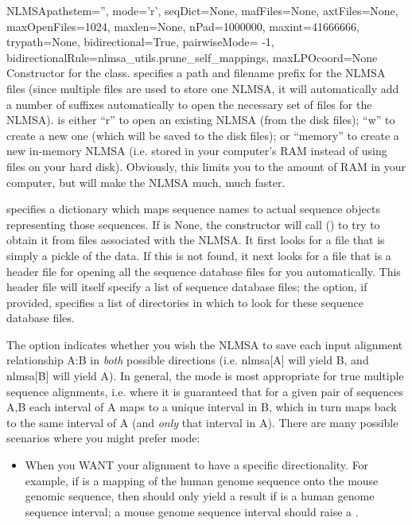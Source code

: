 \documentclass{howto}
\begin{document}
\begin{funcdesc}{NLMSA}{pathstem='', mode='r', seqDict=None, mafFiles=None, axtFiles=None, maxOpenFiles=1024, maxlen=None, nPad=1000000, maxint=41666666, trypath=None, bidirectional=True, pairwiseMode= -1, bidirectionalRule=nlmsa_utils.prune_self_mappings, maxLPOcoord=None}
  Constructor for the class.   specifies a path and filename prefix for
  the NLMSA files (since multiple files are used to store one NLMSA, it will automatically add a
  number of suffixes automatically to open the necessary set of files for the NLMSA).
   is either ``r'' to open an existing NLMSA (from the  disk files); 
  ``w'' to create a new one (which will be saved to the  disk files);
  or ``memory'' to create a new in-memory NLMSA (i.e. stored in your computer's RAM
  instead of using files on your hard disk).  Obviously, this limits you to 
  the amount of RAM in your computer, but will make the NLMSA much, much faster.

   specifies a dictionary which maps sequence names to actual sequence
  objects representing those sequences.  If  is None, the constructor
  will call () to try to obtain it from files
  associated with the NLMSA.  It first looks for a file  
  that is simply a pickle of the  data.  If this is not found, it
  next looks for a file  that is a 
  header file for opening all the sequence database files for you automatically.
  This header file will itself specify a list of sequence database files; the
   option, if provided, specifies a list of directories in which to look for these
  sequence database files.

  The  option indicates whether you wish the NLMSA to
  save each input alignment relationship A:B in {\em both} possible directions
  (i.e. nlmsa[A] will yield B, and nlmsa[B] will yield A).  In general, the
   mode is most appropriate for true multiple sequence
  alignments, i.e. where it is guaranteed that for a given pair of sequences A,B
  each interval of A maps to a unique interval in B, which in turn maps back
  to the same interval of A (and {\em only} that interval in A).  There are
  many possible scenarios where you might prefer  mode:
\begin{itemize}
\item When you WANT your alignment to have a specific directionality.  For example,
if  is a mapping of the human genome sequence onto the mouse genomic
sequence, then  should only yield a result if  is a human
genome sequence interval; a mouse genome sequence interval should raise a .


\end{itemize}
\end{funcdesc}
\end{document}
